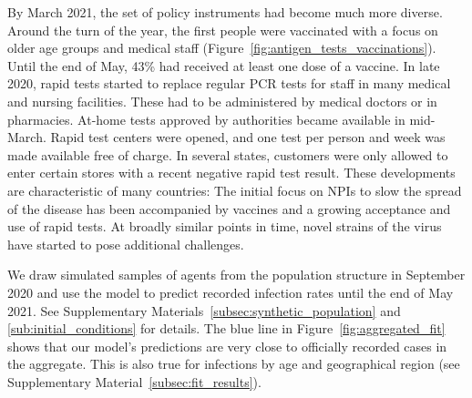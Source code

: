 \documentclass[12pt]{article}
\begin{document}
\begin{figure}[!tp]
\end{figure}

By March 2021, the set of policy instruments had become much more diverse. Around the
turn of the year, the first people were vaccinated with a focus on older age groups and
medical staff (Figure~\ref{fig:antigen_tests_vaccinations}). Until the end of May, 43\%
had received at least one dose of a vaccine. In late 2020, rapid tests started to
replace regular PCR tests for staff in many medical and nursing facilities. These had to
be administered by medical doctors or in pharmacies. At-home tests approved by
authorities became available in mid-March. Rapid test centers were opened, and one test
per person and week was made available free of charge. In several states, customers were
only allowed to enter certain stores with a recent negative rapid test result. These
developments are characteristic of many countries: The initial focus on NPIs to slow the
spread of the disease has been accompanied by vaccines and a growing acceptance and use
of rapid tests. At broadly similar points in time, novel strains of the virus have
started to pose additional challenges.

We draw simulated samples of agents from the population structure in September 2020 and
use the model to predict recorded infection rates until the end of May 2021. See
Supplementary Materials~\ref{subsec:synthetic_population} and
\ref{sub:initial_conditions} for details. The blue line in
Figure~\ref{fig:aggregated_fit} shows that our model's predictions are very close to
officially recorded cases in the aggregate. This is also true for infections by age and
geographical region (see Supplementary Material~\ref{subsec:fit_results}).
\end{document}
